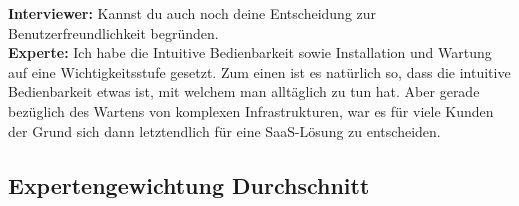 \begin{linenumbers}
    \textbf{Interviewer:} Kannst du auch noch deine Entscheidung zur Benutzerfreundlichkeit begründen.\\
    \textbf{Experte:} Ich habe die Intuitive Bedienbarkeit sowie Installation und Wartung auf eine Wichtigkeitsstufe gesetzt. Zum einen ist es natürlich so, dass die intuitive Bedienbarkeit etwas ist, mit welchem man alltäglich zu tun hat. Aber gerade bezüglich des Wartens von komplexen Infrastrukturen, war es für viele Kunden der Grund sich dann letztendlich für eine SaaS-Lösung zu entscheiden.\\
\end{linenumbers}



\newpage
\subsection{Expertengewichtung Durchschnitt}
\begin{center}
\begin{figure}[H]
    \centering
    \label{fig:gew_d1}
\end{figure}	
\end{center}
\begin{center}
\begin{figure}[H]
    \centering
    \label{fig:gew_d2}
\end{figure}	
\end{center}

\begin{center}
\begin{figure}[H]
    \centering
    \label{fig:gew_d3}
\end{figure}	
\end{center}